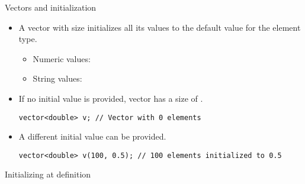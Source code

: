 \begin{frame}[t,fragile]{Vectors and initialization}
\begin{itemize}
  \item A vector with size initializes all its values to the default value for the element type.
    \begin{itemize}
      \item Numeric values: 
      \item String values: 
    \end{itemize}

  \vfill
  \item If no initial value is provided, vector has a size of .
\begin{lstlisting}
vector<double> v; // Vector with 0 elements
\end{lstlisting}

  \vfill
  \item A different initial value can be provided.
\begin{lstlisting}
vector<double> v(100, 0.5); // 100 elements initialized to 0.5
\end{lstlisting}
\end{itemize}
\end{frame}

\begin{frame}
\begin{block}{Initializing at definition}

\end{block}
\end{frame}

